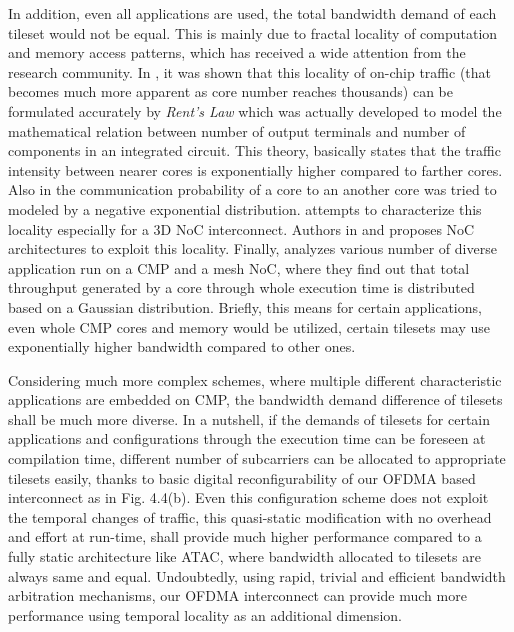 In addition, even all applications are used, the total bandwidth demand of each tileset would not be equal. This is mainly due to fractal locality of computation and memory access patterns, which has received a wide attention from the research community. In \cite{greenfield2010rentian}, it was shown that this locality of on-chip traffic (that becomes much more apparent as core number reaches thousands) can be formulated accurately by \textit{Rent's Law} which was actually developed to model the mathematical relation between number of output terminals and number of components in an integrated circuit. This theory, basically states that the traffic intensity between nearer cores is exponentially higher compared to farther cores. Also in \cite{rahmani2009negative} the communication probability of a core to an another core was tried to modeled by a negative exponential distribution. \cite{bahrebar2014characterizing} attempts to characterize this locality especially for a 3D NoC interconnect. Authors in \cite{manevich2012handling} and \cite{more2013network} proposes NoC architectures to exploit this locality. Finally, \cite{soteriou2006statistical} analyzes various number of diverse application run on a CMP and a mesh NoC, where they find out that total throughput generated by a core through whole execution time is distributed based on a Gaussian distribution. Briefly, this means for certain applications, even whole CMP cores and memory would be utilized, certain tilesets may use exponentially higher bandwidth compared to other ones. 

Considering much more complex schemes, where multiple different characteristic applications are embedded on CMP, the bandwidth demand  difference of tilesets shall be much more diverse. In a nutshell, if the demands of tilesets for certain applications and configurations through the execution time can be foreseen at compilation time, different number of subcarriers can be allocated to appropriate tilesets easily, thanks to basic digital reconfigurability of our OFDMA based interconnect as in Fig. 4.4(b). Even this configuration scheme does not exploit the temporal changes of traffic, this quasi-static modification with no overhead and effort at run-time, shall provide much higher performance compared to a fully static architecture like ATAC, where bandwidth allocated to tilesets are always same and equal. Undoubtedly, using rapid, trivial and efficient bandwidth arbitration mechanisms, our OFDMA interconnect can provide much more performance using temporal locality as an additional dimension.

